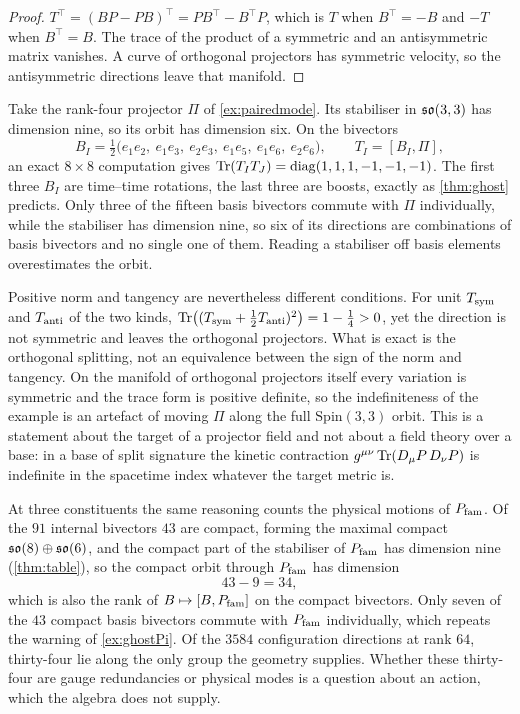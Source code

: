 \begin{proof}
$T^{\!\top}=(BP-PB)^{\!\top}=PB^{\!\top}-B^{\!\top}P$, which is $T$ when $B^{\!\top}=-B$ and $-T$ when $B^{\!\top}=B$. The trace of the
product of a symmetric and an antisymmetric matrix vanishes. A curve of orthogonal projectors has symmetric velocity, so the
antisymmetric directions leave that manifold.
\end{proof}

\begin{example}
\label{ex:ghostPi}
Take the rank-four projector $\Pi$ of \cref{ex:pairedmode}. Its stabiliser in $\mathfrak{so}(3,3)$ has dimension nine, so its orbit has
dimension six. On the bivectors
\[
B_I=\tfrac12\bigl(e_1e_2,\ e_1e_3,\ e_2e_3,\ e_1e_5,\ e_1e_6,\ e_2e_6\bigr),\qquad T_I=[B_I,\Pi],
\]
an exact $8\times8$ computation gives $\operatorname{Tr}(T_IT_J)=\operatorname{diag}(1,1,1,-1,-1,-1)$. The first three $B_I$ are time--time rotations,
the last three are boosts, exactly as \cref{thm:ghost} predicts. Only three of the fifteen basis bivectors commute with $\Pi$
individually, while the stabiliser has dimension nine, so six of its directions are combinations of basis bivectors and no single
one of them. Reading a stabiliser off basis elements overestimates the orbit.
\end{example}

Positive norm and tangency are nevertheless different conditions. For unit $T_{\rm sym}$ and $T_{\rm anti}$ of the two kinds,
$\operatorname{Tr}\bigl((T_{\rm sym}+\tfrac12T_{\rm anti})^2\bigr)=1-\tfrac14>0$, yet the direction is not symmetric and leaves the orthogonal
projectors. What is exact is the orthogonal splitting, not an equivalence between the sign of the norm and tangency. On the manifold
of orthogonal projectors itself every variation is symmetric and the trace form is positive definite, so the indefiniteness of the
example is an artefact of moving $\Pi$ along the full $\mathrm{Spin}(3,3)$ orbit. This is a statement about the target of a
projector field and not about a field theory over a base: in a base of split signature the kinetic contraction
$g^{\mu\nu}\operatorname{Tr}(D_\mu P\,D_\nu P)$ is indefinite in the spacetime index whatever the target metric is.

At three constituents the same reasoning counts the physical motions of $P_{\rm fam}$. Of the $91$ internal bivectors $43$ are compact,
forming the maximal compact $\mathfrak{so}(8)\oplus\mathfrak{so}(6)$, and the compact part of the stabiliser of $P_{\rm fam}$ has dimension nine
(\cref{thm:table}), so the compact orbit through $P_{\rm fam}$ has dimension
\[
43-9=34 ,
\]
which is also the rank of $B\mapsto[B,P_{\rm fam}]$ on the compact bivectors. Only seven of the $43$ compact basis bivectors commute with
$P_{\rm fam}$ individually, which repeats the warning of \cref{ex:ghostPi}. Of the $3584$ configuration directions at rank $64$,
thirty-four lie along the only group the geometry supplies. Whether these thirty-four are gauge redundancies or physical modes is a
question about an action, which the algebra does not supply.

